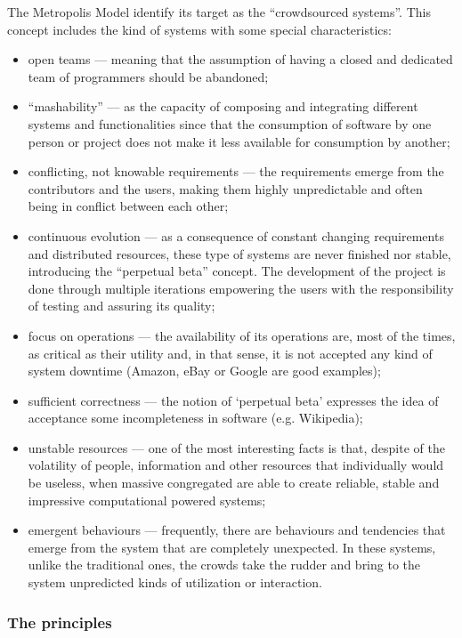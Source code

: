 The Metropolis Model identify its target as the ``crowdsourced systems''. This concept includes the kind of systems with some special characteristics:
\begin{itemize}
\item open teams --- meaning that the assumption of having a closed and dedicated team of programmers should be abandoned;
\item ``mashability'' --- as the capacity of composing and integrating different systems and functionalities since that
the consumption of software by one person or project does not make it less available for consumption by another;
\item conflicting, not knowable requirements --- the requirements emerge from the contributors and the users, making them highly unpredictable and often being in conflict between each other;
\item continuous evolution --- as a consequence of constant changing requirements and distributed resources, these type of systems are never finished nor stable, introducing the ``perpetual beta'' concept. The development of the project is done through multiple iterations empowering the users with the responsibility of testing and assuring its quality;
\item focus on operations --- the availability of its operations are, most of the times, as critical as their utility and, in that sense, it is not accepted any kind of system downtime (Amazon, eBay or Google are good examples);
\item sufficient correctness --- the notion of `perpetual beta' expresses the idea of acceptance some incompleteness in software (e.g. Wikipedia);
\item unstable resources --- one of the most interesting facts is that, despite of the volatility of people, information and other resources that individually would be useless, when massive congregated are able to create reliable, stable and impressive computational powered systems;
\item emergent behaviours --- frequently, there are behaviours and tendencies that emerge from the system that are completely unexpected. In these systems, unlike the traditional ones, the crowds take the rudder and bring to the system unpredicted kinds of utilization or interaction.
\end{itemize}

\subsubsection{The principles}

